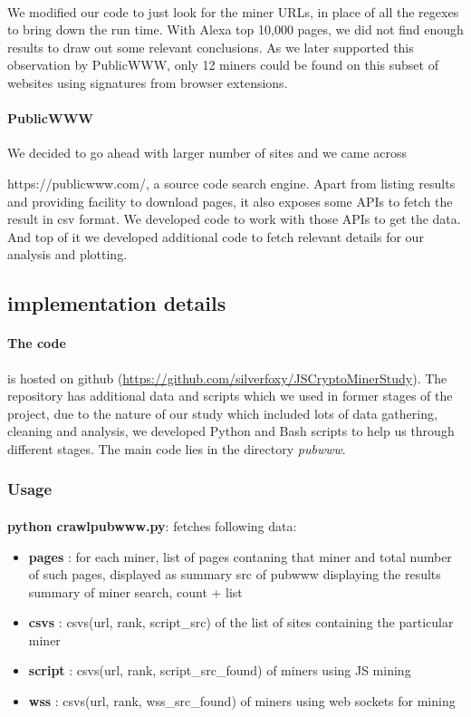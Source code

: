 \documentclass[letterpaper]{scrartcl} %
\numberwithin{equation}{section} %
\numberwithin{figure}{section} %
\numberwithin{table}{section} %
\begin{document}
\paragraph{}
We modified our code to just look for the miner URLs, in place of all the regexes to bring
down the run time. With Alexa top 10,000 pages, we did not find enough results to draw out some relevant conclusions. As we later supported this observation by PublicWWW, only 12 miners could be found on this subset of websites using signatures from browser extensions.

\paragraph{\textbf{PublicWWW}}
We decided to go ahead with larger number of sites and we came across

https://publicwww.com/,
a source code search engine. Apart from listing results and providing facility to download pages,
it also exposes some APIs to fetch the result in csv format. We developed code to work with those APIs to get
the data. And top of it we developed additional code to fetch relevant details for our analysis and plotting.

\subsection{implementation details}
\paragraph{\textbf{The code}} is hosted on github (\href{https://github.com/silverfoxy/JSCryptoMinerStudy}{https://github.com/silverfoxy/JSCryptoMinerStudy}). The repository has additional data and scripts which we used in former stages of the project, due to the nature of our study which included lots of data gathering, cleaning and analysis, we developed Python and Bash scripts to help us through different stages. The main code lies
in the directory \textit{pubwww}.

\subsubsection{Usage}
\paragraph{}
\textbf{python crawlpubwww.py}:
fetches following data:
\begin{itemize}
\item \textbf{pages} : for each miner, list of pages contaning that miner and total number of such pages, displayed
as summary src of pubwww displaying the results summary of miner search, count + list
\item \textbf{csvs} : csvs(url, rank, script\_src) of the list of sites containing the particular miner
\item \textbf{script} : csvs(url, rank, script\_src\_found) of miners using JS mining
\item \textbf{wss} : csvs(url, rank, wss\_src\_found) of miners using web sockets for mining
\end{itemize}
\end{document}
